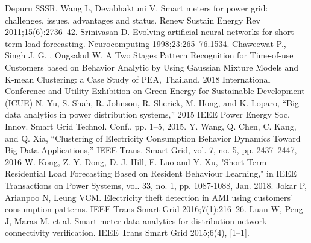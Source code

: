 \documentclass[conference]{IEEEtran}
\begin{document}
\begin{thebibliography}{00}
 Depuru SSSR, Wang L, Devabhaktuni V. Smart meters for power grid: challenges, issues, advantages and status. Renew Sustain Energy Rev 2011;15(6):2736–42.
 Srinivasan D. Evolving artificial neural networks for short term load forecasting. Neurocomputing 1998;23:265–76.1534.
 Chaweewat P., Singh J. G. , Ongsakul W. A Two Stages Pattern Recognition for Time-of-use Customers based on Behavior Analytic by Using Gaussian Mixture Models and K-mean Clustering: a Case Study of PEA, Thailand, 2018 International Conference and Utility Exhibition on Green Energy for Sustainable Development (ICUE)
 N. Yu, S. Shah, R. Johnson, R. Sherick, M. Hong, and K. Loparo, “Big data analytics in power distribution systems,” 2015 IEEE Power Energy Soc. Innov. Smart Grid Technol. Conf., pp. 1–5, 2015.
 Y. Wang, Q. Chen, C. Kang, and Q. Xia, “Clustering of Electricity Consumption Behavior Dynamics Toward Big Data Applications,” IEEE Trans. Smart Grid, vol. 7, no. 5, pp. 2437–2447, 2016
 W. Kong, Z. Y. Dong, D. J. Hill, F. Luo and Y. Xu, "Short-Term Residential Load Forecasting Based on Resident Behaviour Learning," in IEEE Transactions on Power Systems, vol. 33, no. 1, pp. 1087-1088, Jan. 2018.
 Jokar P, Arianpoo N, Leung VCM. Electricity theft detection in AMI using customers' consumption patterns. IEEE Trans Smart Grid 2016;7(1):216–26.
 Luan W, Peng J, Maras M, et al. Smart meter data analytics for distribution network connectivity verification. IEEE Trans Smart Grid 2015;6(4), [1–1].
\end{thebibliography}
\end{document}
